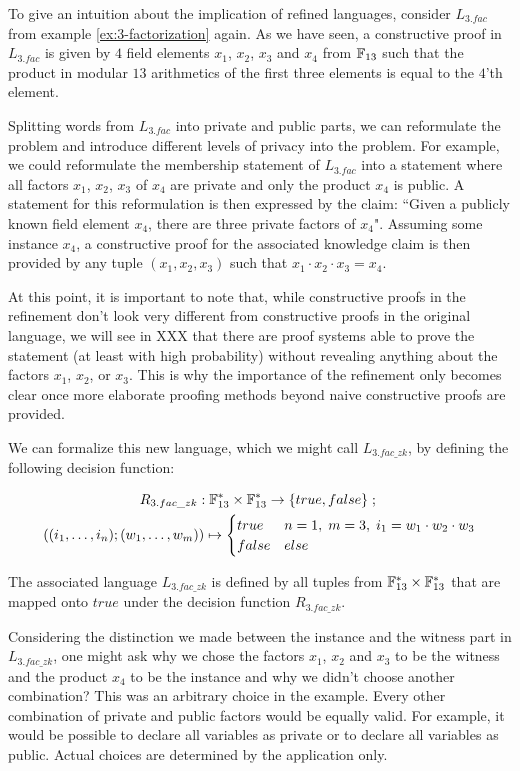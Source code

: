 \begin{example}[3-factorization] To give an intuition about the implication of refined languages, consider $L_{3.fac}$ from example \ref{ex:3-factorization} again. As we have seen, a constructive proof in $L_{3.fac}$ is given by $4$ field elements $x_1$, $x_2$, $x_3$ and $x_4$ from $\mathbb{F}_{13}$ such that the product in modular $13$ arithmetics of the first three elements is equal to the $4$'th element. 

Splitting words from $L_{3.fac}$ into private and public parts, we can reformulate the problem and introduce different levels of privacy into the problem. For example, we could reformulate the membership statement of $L_{3.fac}$ into a statement where all factors $x_1$, $x_2$, $x_3$ of $x_4$ are private and only the product $x_4$ is public. A statement for this reformulation is then expressed by the claim: ``Given a publicly known field element $x_4$, there are three private factors of $x_4$". Assuming some instance $x_4$, a constructive proof for the associated knowledge claim is then provided by any tuple $(x_1,x_2,x_3)$ such that $x_1\cdot x_2\cdot x_3= x_4$. 

At this point, it is important to note that, while constructive proofs in the refinement don't look very different from constructive proofs in the original language, we will see in XXX that there are proof systems able to prove the statement (at least with high probability) without revealing anything about the factors $x_1$, $x_2$, or $x_3$. This is why the importance of the refinement only becomes clear once more elaborate proofing methods beyond naive constructive proofs are provided.

We can formalize this new language, which we might call $L_{3.fac\_zk}$, by defining the following decision function: 
\begin{definition}\label{R3-fac-zk}
\begin{multline*}
R_{3.fac\_zk} : \mathbb{F}_{13}^* \times \mathbb{F}_{13}^* \to \{true, false\}\;;\;\\
((i_1,\ldots,i_n);(w_1,\ldots, w_m)) \mapsto
\begin{cases}
true & n=1,\; m=3,\; i_1 = w_1\cdot w_2 \cdot w_3\\
false & else
\end{cases}
\end{multline*}
\end{definition}
The associated language $L_{3.fac\_zk}$ is defined by all tuples from $\mathbb{F}_{13}^* \times \mathbb{F}_{13}^*$ that are mapped onto $true$ under the decision function $R_{3.fac\_zk}$. 

Considering the distinction we made between the instance and the witness part in $L_{3.fac\_zk}$, one might ask why we chose the factors $x_1$, $x_2$ and $x_3$ to be the witness and the product $x_4$ to be the instance and why we didn't choose another combination? This was an arbitrary choice in the example. Every other combination of private and public factors would be equally valid. For example, it would be possible to declare all variables as private or to declare all variables as public. Actual choices are determined by the application only.
\end{example}
